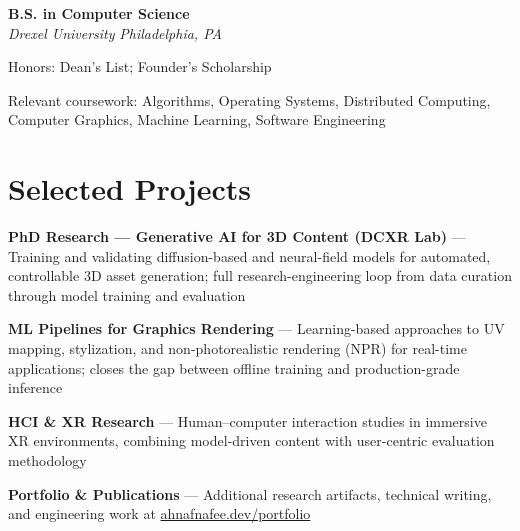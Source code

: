 \documentclass[letterpaper,10pt]{article}
\newcommand{\education}[4]{%
  \textbf{#1} \hfill \textit{#3}\\[-1pt]
  \textit{#2} \hfill \textit{#4}\par\vspace{2pt}
}
\begin{document}
\education{B.S. in Computer Science}{Drexel University}{}{Philadelphia, PA}
\begin{tightitemize}
  \item Honors: Dean's List; Founder's Scholarship
  \item Relevant coursework: Algorithms, Operating Systems, Distributed Computing, Computer Graphics, Machine Learning, Software Engineering
\end{tightitemize}

\section*{Selected Projects}
\begin{tightitemize}
\item \textbf{PhD Research --- Generative AI for 3D Content (DCXR Lab)} --- Training and validating diffusion-based and neural-field models for automated, controllable 3D asset generation; full research-engineering loop from data curation through model training and evaluation
\item \textbf{ML Pipelines for Graphics Rendering} --- Learning-based approaches to UV mapping, stylization, and non-photorealistic rendering (NPR) for real-time applications; closes the gap between offline training and production-grade inference
\item \textbf{HCI \& XR Research} --- Human--computer interaction studies in immersive XR environments, combining model-driven content with user-centric evaluation methodology
\item \textbf{Portfolio \& Publications} --- Additional research artifacts, technical writing, and engineering work at \href{https://www.ahnafnafee.dev/portfolio}{ahnafnafee.dev/portfolio}
\end{tightitemize}
\end{document}

